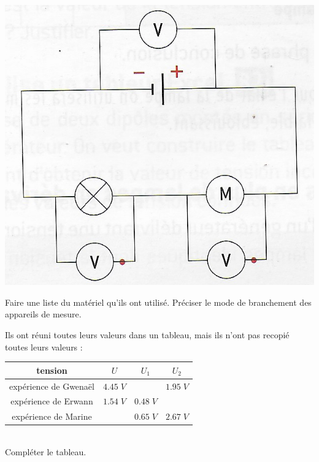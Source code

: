 \documentclass[a4paper,11pt]{exam}
\begin{document}
\begin{center}
	\includegraphics[scale=0.37]{circuit}
\end{center}

\begin{questions}
	\question Faire une liste du matériel qu'ils ont utilisé. Préciser le mode de branchement des appareils de mesure.
	
	\question Ils ont réuni toutes leurs valeurs dans un tableau, mais ils n'ont pas recopié toutes leurs valeurs :
	
	\begin{tabular}{|c|c|c|c|}
		\hline
		\textbf{tension}      & $U$            & $U_1$         & $U_2$          \\ \hline
		expérience de Gwenaël & $\num{4.45} \; V$ &               & $\num{1.95} \; V$ \\ \hline
		expérience de Erwann  & $\num{1.54} \; V$ & $\num{0.48} \;V$ &                \\ \hline
		expérience de Marine  &                & $\num{0.65} \; V$ & $\num{2.67} \; V$ \\ \hline
	\end{tabular}

	\ \\
	Compléter le tableau.
\end{questions}




\label{LastPage}
\end{document}
